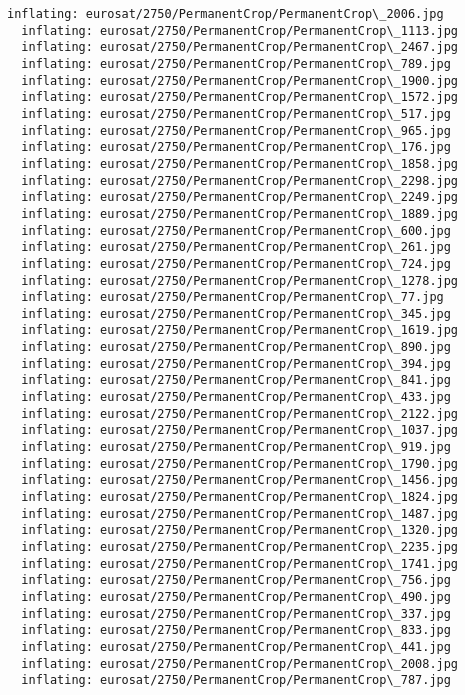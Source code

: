 \documentclass[11pt]{article}
\begin{document}
\begin{Verbatim}[commandchars=\\\{\}]
  inflating: eurosat/2750/PermanentCrop/PermanentCrop\_2006.jpg
  inflating: eurosat/2750/PermanentCrop/PermanentCrop\_1113.jpg
  inflating: eurosat/2750/PermanentCrop/PermanentCrop\_2467.jpg
  inflating: eurosat/2750/PermanentCrop/PermanentCrop\_789.jpg
  inflating: eurosat/2750/PermanentCrop/PermanentCrop\_1900.jpg
  inflating: eurosat/2750/PermanentCrop/PermanentCrop\_1572.jpg
  inflating: eurosat/2750/PermanentCrop/PermanentCrop\_517.jpg
  inflating: eurosat/2750/PermanentCrop/PermanentCrop\_965.jpg
  inflating: eurosat/2750/PermanentCrop/PermanentCrop\_176.jpg
  inflating: eurosat/2750/PermanentCrop/PermanentCrop\_1858.jpg
  inflating: eurosat/2750/PermanentCrop/PermanentCrop\_2298.jpg
  inflating: eurosat/2750/PermanentCrop/PermanentCrop\_2249.jpg
  inflating: eurosat/2750/PermanentCrop/PermanentCrop\_1889.jpg
  inflating: eurosat/2750/PermanentCrop/PermanentCrop\_600.jpg
  inflating: eurosat/2750/PermanentCrop/PermanentCrop\_261.jpg
  inflating: eurosat/2750/PermanentCrop/PermanentCrop\_724.jpg
  inflating: eurosat/2750/PermanentCrop/PermanentCrop\_1278.jpg
  inflating: eurosat/2750/PermanentCrop/PermanentCrop\_77.jpg
  inflating: eurosat/2750/PermanentCrop/PermanentCrop\_345.jpg
  inflating: eurosat/2750/PermanentCrop/PermanentCrop\_1619.jpg
  inflating: eurosat/2750/PermanentCrop/PermanentCrop\_890.jpg
  inflating: eurosat/2750/PermanentCrop/PermanentCrop\_394.jpg
  inflating: eurosat/2750/PermanentCrop/PermanentCrop\_841.jpg
  inflating: eurosat/2750/PermanentCrop/PermanentCrop\_433.jpg
  inflating: eurosat/2750/PermanentCrop/PermanentCrop\_2122.jpg
  inflating: eurosat/2750/PermanentCrop/PermanentCrop\_1037.jpg
  inflating: eurosat/2750/PermanentCrop/PermanentCrop\_919.jpg
  inflating: eurosat/2750/PermanentCrop/PermanentCrop\_1790.jpg
  inflating: eurosat/2750/PermanentCrop/PermanentCrop\_1456.jpg
  inflating: eurosat/2750/PermanentCrop/PermanentCrop\_1824.jpg
  inflating: eurosat/2750/PermanentCrop/PermanentCrop\_1487.jpg
  inflating: eurosat/2750/PermanentCrop/PermanentCrop\_1320.jpg
  inflating: eurosat/2750/PermanentCrop/PermanentCrop\_2235.jpg
  inflating: eurosat/2750/PermanentCrop/PermanentCrop\_1741.jpg
  inflating: eurosat/2750/PermanentCrop/PermanentCrop\_756.jpg
  inflating: eurosat/2750/PermanentCrop/PermanentCrop\_490.jpg
  inflating: eurosat/2750/PermanentCrop/PermanentCrop\_337.jpg
  inflating: eurosat/2750/PermanentCrop/PermanentCrop\_833.jpg
  inflating: eurosat/2750/PermanentCrop/PermanentCrop\_441.jpg
  inflating: eurosat/2750/PermanentCrop/PermanentCrop\_2008.jpg
  inflating: eurosat/2750/PermanentCrop/PermanentCrop\_787.jpg

\end{Verbatim}
\end{document}
